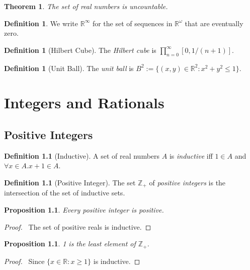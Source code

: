 \documentclass{book}
\let\qed\relax
\newtheorem{prop}[ax]{Proposition}
\newtheorem{thm}[ax]{Theorem}
\theoremstyle{definition}
\newtheorem{df}[ax]{Definition}
\begin{document}
\begin{thm}
The set of real numbers is uncountable.
\end{thm}

\begin{df}
We write $\mathbb{R}^\infty$ for the set of sequences in $\mathbb{R}^\omega$ that are eventually zero.
\end{df}

\begin{df}[Hilbert Cube]
The \emph{Hilbert cube} is $\prod_{n=0}^\infty [0,1/(n+1)]$.
\end{df}

\begin{df}[Unit Ball]
The \emph{unit ball} is $B^2 := \{ (x,y) \in \mathbb{R}^2 : x^2 + y^2 \leq 1 \}$.
\end{df}

\chapter{Integers and Rationals}

\section{Positive Integers}

\begin{df}[Inductive]
A set of real numbers $A$ is \emph{inductive} iff $1 \in A$ and $\forall x \in A. x + 1 \in A$.
\end{df}

\begin{df}[Positive Integer]
The set $\mathbb{Z}_+$ of \emph{positive integers} is the intersection of the set of inductive sets.
\end{df}

\begin{prop}
Every positive integer is positive.
\end{prop}

\begin{proof}
\pf\ The set of positive reals is inductive. \qed
\end{proof}

\begin{prop}
1 is the least element of $\mathbb{Z}_+$.
\end{prop}

\begin{proof}
\pf\ Since $\{ x \in \mathbb{R} : x \geq 1 \}$ is inductive. \qed
\end{proof}
\end{document}
